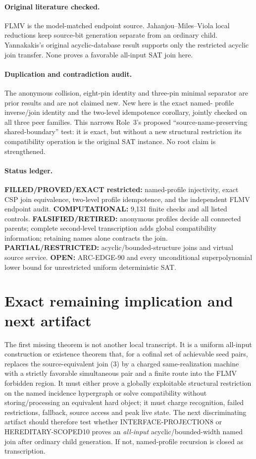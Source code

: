 \documentclass[11pt]{article}
\begin{document}
\paragraph{Original literature checked.}
FLMV is the model-matched endpoint source.  Jahanjou--Miles--Viola local
reductions keep source-bit generation separate from an ordinary child.
Yannakakis's original acyclic-database result supports only the restricted
acyclic join transfer.  None proves a favorable all-input SAT join here.

\paragraph{Duplication and contradiction audit.}
The anonymous collision, eight-pin identity and three-pin minimal separator
are prior results and are not claimed new.  New here is the exact named-
profile inverse/join identity and the two-level idempotence corollary,
jointly checked on all three peer families.  This narrows Role~3's proposed
``source-name-preserving shared-boundary'' test: it is exact, but without a
new structural restriction its compatibility operation is the original SAT
instance.  No root claim is strengthened.

\paragraph{Status ledger.}
\textbf{FILLED/PROVED/EXACT restricted:} named-profile injectivity, exact
CSP join equivalence, two-level profile idempotence, and the independent
FLMV endpoint audit.  \textbf{COMPUTATIONAL:} 9,131 finite checks and all
listed controls.  \textbf{FALSIFIED/RETIRED:} anonymous profiles decide all
connected parents; complete second-level transcription adds global
compatibility information; retaining names alone contracts the join.
\textbf{PARTIAL/RESTRICTED:} acyclic/bounded-structure joins and virtual
source service.  \textbf{OPEN:} ARC-EDGE-90 and every unconditional
superpolynomial lower bound for unrestricted uniform deterministic SAT.

\section{Exact remaining implication and next artifact}
The first missing theorem is not another local transcript.  It is a uniform
all-input construction or existence theorem that, for a cofinal set of
achievable seed pairs, replaces the source-equivalent join (3) by a charged
same-realization machine with a strictly favorable simultaneous pair and a
finite route into the FLMV forbidden region.  It must either prove a
globally exploitable structural restriction on the named incidence
hypergraph or solve compatibility without storing/processing an equivalent
hard object; it must charge recognition, failed restrictions, fallback,
source access and peak live state.  The next discriminating artifact should
therefore test whether INTERFACE-PROJECTION8 or HEREDITARY-SCOPED10 proves an
\emph{all-input} acyclic/bounded-width named join after ordinary child
generation.  If not, named-profile recursion is closed as transcription.
\end{document}
